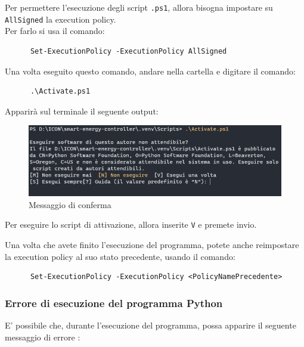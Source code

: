 \documentclass[12pt, letterpaper]{article}
\begin{document}
\noindent Per permettere l'esecuzione degli script \texttt{.ps1}, allora bisogna impostare
su \texttt{AllSigned} la execution policy. \\
\noindent Per farlo si usa il comando: \\

\begin{verbatim}
      Set-ExecutionPolicy -ExecutionPolicy AllSigned
\end{verbatim}

\noindent Una volta eseguito questo comando, andare nella
cartella  e digitare il comando: \\

\begin{verbatim}
      .\Activate.ps1
\end{verbatim}

\break

\noindent Apparirà sul terminale il seguente output:

\begin{figure}[h]
      \centering
      \includegraphics[scale=0.6]{terminal-message.png}
      \caption{Messaggio di conferma}
\end{figure}

\noindent Per eseguire lo script di attivazione, allora inserite \texttt{V} e
premete invio.

\noindent Una volta che avete finito l'esecuzione del programma, potete anche reimpostare
la execution policy al suo stato precedente, usando il comando:

\begin{verbatim}
      Set-ExecutionPolicy -ExecutionPolicy <PolicyNamePrecedente>
\end{verbatim}


\subsubsection{Errore di esecuzione del programma Python}
\label{sec:python-error}

E' possibile che, durante l'esecuzione del programma, possa apparire il seguente
messaggio di errore \cite{python-mapping-problem}:
\end{document}
